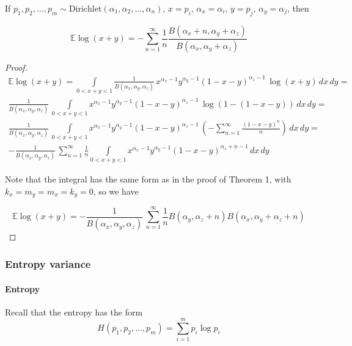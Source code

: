 \documentclass{article}
\begin{document}
\begin{theorem}
If $p_1, p_2, \ldots, p_m \sim \textrm{Dirichlet}(\alpha_1, \alpha_2, \ldots, \alpha_n)$, $x = p_i$, $\alpha_x = \alpha_i$, $y = p_j$, $\alpha_y = \alpha_j$, then

\begin{equation}
\mathbb{E}\log(x + y) = -\sum_{n=1}^{\infty}{\frac{1}{n} \frac{B(\alpha_x + n, \alpha_y + \alpha_z)}{B(\alpha_x, \alpha_y + \alpha_z)}}
\end{equation}

\begin{proof}

\begin{multline}
\mathbb{E}\log(x + y) = \int\limits_{0 < x + y < 1}{\frac{1}{B(\alpha_x, \alpha_y, \alpha_z)} \, x^{\alpha_x - 1} y^{\alpha_y - 1} (1 - x - y)^{\alpha_z - 1} \, \log(x + y) \, dx \, dy} = 
\\ \frac{1}{B(\alpha_x, \alpha_y, \alpha_z)} \, \int\limits_{0 < x + y < 1}{ x^{\alpha_x - 1} y^{\alpha_y - 1} (1 - x - y)^{\alpha_z - 1} \, \log(1 - (1 - x - y)) \, dx \, dy} = 
\\ \frac{1}{B(\alpha_x, \alpha_y, \alpha_z)} \, \int\limits_{0 < x + y < 1}{ x^{\alpha_x - 1} y^{\alpha_y - 1} (1 - x - y)^{\alpha_z - 1} \, (-\sum_{n=1}^{\infty}{\frac{(1 - x - y)^n}{n}}) \, dx \, dy} =
\\ -\frac{1}{B(\alpha_x, \alpha_y, \alpha_z)} \, \sum_{n=1}^{\infty}{\frac{1}{n} \int\limits_{0 < x + y < 1}{ x^{\alpha_x - 1} y^{\alpha_y - 1} (1 - x - y)^{\alpha_z + n - 1} \, dx \, dy}}
\end{multline}

Note that the integral has the same form as in the proof of Theorem 1, with $k_x = m_y = m_x = k_y = 0$, so we have
	
\begin{equation*}
\mathbb{E}\log(x + y) = -\frac{1}{B(\alpha_x, \alpha_y, \alpha_z)} \, \sum_{n=1}^{\infty}{\frac{1}{n} B(\alpha_y, \alpha_z + n) B(\alpha_x, \alpha_y + \alpha_z + n)} 
\end{equation*}	

\end{proof}
\end{theorem}

\subsubsection{Entropy variance}
\paragraph{Entropy} Recall that the entropy has the form
\begin{equation*}
H(p_1, p_2, \ldots, p_m) = \sum_{i = 1}^m{p_i \log p_i}
\end{equation*}
\end{document}
